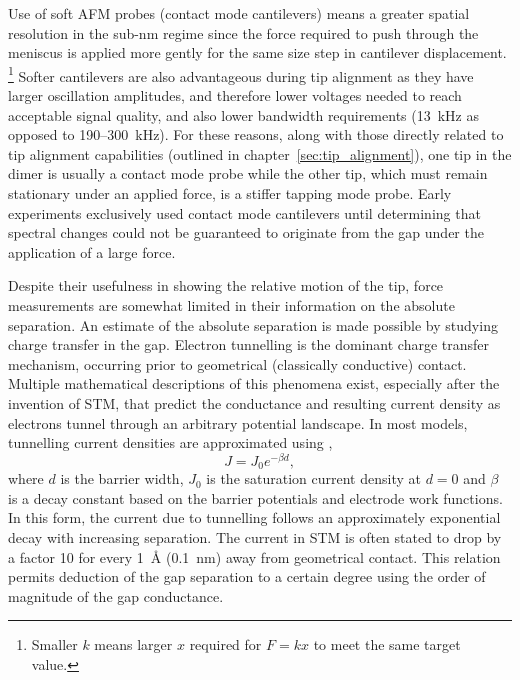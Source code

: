 \documentclass[a4paper]{article}
\begin{document}
Use of soft AFM probes (contact mode cantilevers) means a greater spatial resolution in the sub-nm regime since the force required to push through the meniscus is applied more gently for the same size step in cantilever displacement.%
\footnote{Smaller $k$ means larger $x$ required for $F=kx$ to meet the same target value.}
Softer cantilevers are also advantageous during tip alignment as they have larger oscillation amplitudes, and therefore lower voltages needed to reach acceptable signal quality, and also lower bandwidth requirements (\SI{13}{kHz} as opposed to 190--\SI{300}{kHz}).
For these reasons, along with those directly related to tip alignment capabilities (outlined in chapter~\ref{sec:tip_alignment}), one tip in the dimer is usually a contact mode probe while the other tip, which must remain stationary under an applied force, is a stiffer tapping mode probe. Early experiments exclusively used contact mode cantilevers until determining that spectral changes could not be guaranteed to originate from the gap under the application of a large force.

Despite their usefulness in showing the relative motion of the tip, force measurements are somewhat limited in their information on the absolute separation. An estimate of the absolute separation is made possible by studying charge transfer in the gap.
Electron tunnelling is the dominant charge transfer mechanism, occurring prior to geometrical (classically conductive) contact. Multiple mathematical descriptions of this phenomena exist\cite{simmons1963generalized, blanco2006stm}, especially after the invention of STM, that predict the conductance and resulting current density as electrons tunnel through an arbitrary potential landscape. In most models, tunnelling current densities are approximated using \cite{tan2014},
\begin{equation}
	J=J_0e^{-\beta d},
\end{equation}
where $d$ is the barrier width, $J_0$ is the saturation current density at $d=0$ and $\beta$ is a decay constant based on the barrier potentials and electrode work functions. In this form, the current due to tunnelling follows an approximately exponential decay with increasing separation. The current in STM is often stated to drop by a factor 10 for every \SI{1}{\angstrom} (\SI{0.1}{nm}) away from geometrical contact. This relation permits deduction of the gap separation to a certain degree using the order of magnitude of the gap conductance.
\end{document}
